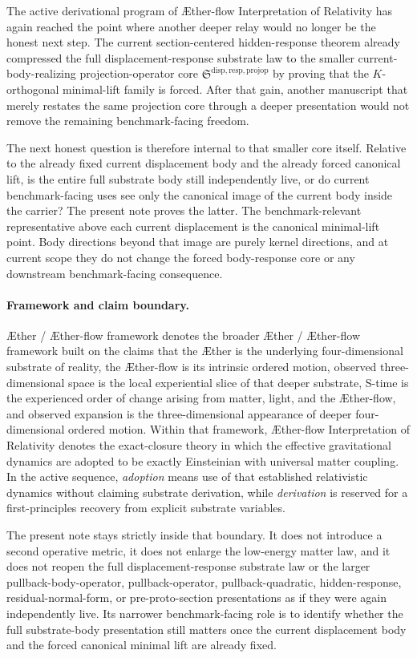 \documentclass[11pt]{article}
\newcommand{\Aether}{\AE{}ther}
\newcommand{\Aflow}{\AE{}ther-flow}
\newcommand{\TheoryName}{\Aflow{} Interpretation of Relativity}
\newcommand{\TheoryProgram}{\Aether{} / \Aflow{} framework}
\newcommand{\ProjectionOperatorCore}{\mathfrak S^{\mathrm{disp,resp,projop}}}
\begin{document}
The active derivational program of \TheoryName{} has again reached the point where another deeper relay would no longer be the honest next step. The current section-centered hidden-response theorem already compressed the full displacement-response substrate law to the smaller current-body-realizing projection-operator core \(\ProjectionOperatorCore\) by proving that the \(K\)-orthogonal minimal-lift family is forced. After that gain, another manuscript that merely restates the same projection core through a deeper presentation would not remove the remaining benchmark-facing freedom.

The next honest question is therefore internal to that smaller core itself. Relative to the already fixed current displacement body and the already forced canonical lift, is the entire full substrate body still independently live, or do current benchmark-facing uses see only the canonical image of the current body inside the carrier? The present note proves the latter. The benchmark-relevant representative above each current displacement is the canonical minimal-lift point. Body directions beyond that image are purely kernel directions, and at current scope they do not change the forced body-response core or any downstream benchmark-facing consequence.

\paragraph{Framework and claim boundary.}
\TheoryProgram{} denotes the broader \Aether{} / \Aflow{} framework built on the claims that the \Aether{} is the underlying four-dimensional substrate of reality, the \Aflow{} is its intrinsic ordered motion, observed three-dimensional space is the local experiential slice of that deeper substrate, S-time is the experienced order of change arising from matter, light, and the \Aflow{}, and observed expansion is the three-dimensional appearance of deeper four-dimensional ordered motion. Within that framework, \TheoryName{} denotes the exact-closure theory in which the effective gravitational dynamics are adopted to be exactly Einsteinian with universal matter coupling. In the active sequence, \emph{adoption} means use of that established relativistic dynamics without claiming substrate derivation, while \emph{derivation} is reserved for a first-principles recovery from explicit substrate variables.

The present note stays strictly inside that boundary. It does not introduce a second operative metric, it does not enlarge the low-energy matter law, and it does not reopen the full displacement-response substrate law or the larger pullback-body-operator, pullback-operator, pullback-quadratic, hidden-response, residual-normal-form, or pre-proto-section presentations as if they were again independently live. Its narrower benchmark-facing role is to identify whether the full substrate-body presentation still matters once the current displacement body and the forced canonical minimal lift are already fixed.
\end{document}
